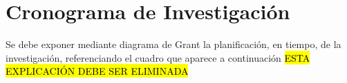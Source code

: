 \section{Cronograma de Investigaci\'{o}n}
\label{cap2:sec:cronograma_de_investigacion}

Se debe exponer mediante diagrama de Grant la planificaci\'{o}n, en tiempo, de la investigaci\'{o}n,
 referenciando el cuadro que aparece a continuaci\'{o}n \hl{ESTA EXPLICACI\'{O}N DEBE SER ELIMINADA}


